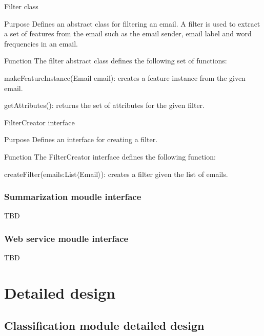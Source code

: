 \documentclass[12pt]{article}
\newenvironment{my_itemize}
{\begin{itemize}
  \setlength{\itemsep}{0cm}
  \setlength{\parskip}{0cm}}
{\end{itemize}}
\newenvironment{my_desc}
{\begin{description}
  \setlength{\itemsep}{0cm}
  \setlength{\parskip}{0cm}}
{\end{description}}
\begin{document}
\begin{my_itemize}
  \item Filter class
  \begin{my_desc}
   \item[Purpose] Defines an abstract class for filtering an email. A filter is used to extract a set of features from the email such as the email sender, email label and word frequencies in an email.
   \item[Function] The filter abstract class defines the following set of functions:
	\begin{my_itemize}
	\item makeFeatureInstance(Email email): creates a feature instance from the given email.
	\item getAttributes(): returns the set of attributes for the given filter.
	\end{my_itemize}
  \end{my_desc}

  \item FilterCreator interface
  \begin{my_desc}
   \item[Purpose] Defines an interface for creating a filter.
   \item[Function] The FilterCreator interface defines the following function:
	\begin{my_itemize}
	\item createFilter(emails:List$\langle$Email$\rangle$): creates a filter given the list of emails.
	\end{my_itemize}
  \end{my_desc}

\end{my_itemize}

\subsubsection{Summarization moudle interface}
TBD

\subsubsection{Web service moudle interface}
TBD

\section{Detailed design}

\subsection{Classification module detailed design}
\end{document}
